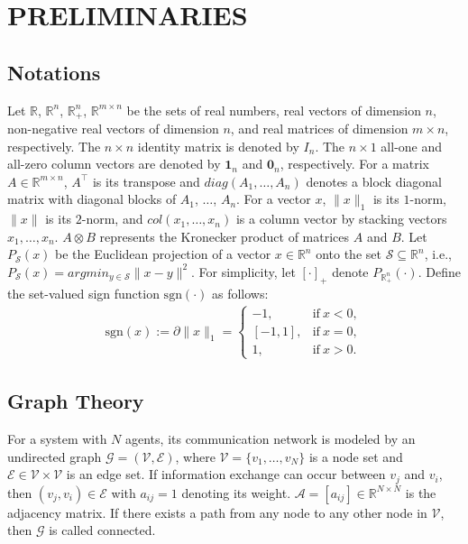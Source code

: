 \documentclass[letterpaper, 10 pt, conference]{ieeeconf}  %
\newcommand{\sign}[1]{\mathrm{sgn}(#1)}
\begin{document}
\section{PRELIMINARIES}\label{pre}

\subsection{Notations}
Let $\mathbb{R}$, $\mathbb{R}^n$, $\mathbb{R}_+^n$, $\mathbb{R}^{m\times n}$ be the sets of  real numbers, real vectors of dimension $n$, non-negative real vectors of dimension $n$, and real matrices of dimension $m\times n$, respectively.
The $n\times n$ identity matrix is denoted by $I_n$. The $n\times 1$ all-one and all-zero column vectors are denoted by $\boldsymbol1_n$ and $\boldsymbol0_n$, respectively.
For a matrix $A\in\mathbb{R}^{m \times n}$, $A^\top $ is its transpose and  $diag(A_1,\dots,A_n)$ denotes a block diagonal matrix with diagonal blocks of $A_1$, $\dots$, $A_n$.
For a vector $x$, $\|x\|_1$ is its $1$-norm, $\|x\|$ is its $2$-norm, and $col(x_1,\dots,x_n)$ is a column vector by stacking vectors $x_1,\dots,x_n$. $A\otimes B$ represents the Kronecker product of matrices $A$ and $B$. 
Let $P_\mathcal{S}(x)$ be the Euclidean projection of a vector $x\in \mathbb{R}^n$ onto the set $\mathcal{S} \subseteq \mathbb{R}^n$, i.e., 
$P_\mathcal{S}(x)=argmin_{y\in\mathcal{S}}\|x-y\|^2$. For simplicity, let $[\cdot]_+$ denote $P_{\mathbb{R}_+^n}(\cdot)$. Define the set-valued sign function $\mathrm{sgn}(\cdot)$ as follows:
\begin{align*}
	\sign{x}:=\partial\|x\|_1=
	\begin{cases}
		-1,&\mathrm{if}\  x<0,\\
		[-1,1],&\mathrm{if}\  x=0,\\
		1,&\mathrm{if}\  x>0.
	\end{cases}
\end{align*}


\subsection{Graph Theory}
For a system with $N$ agents, its communication network is modeled by an undirected graph $\mathcal{G} = (\mathcal{V}, \mathcal{E})$, where $\mathcal{V} = \{v_1, \dots, v_N\}$ is a node set and $\mathcal{E} \in \mathcal{V} \times \mathcal{V}$ is an edge set. If information exchange can occur between $v_j$ and $v_i$, then $(v_j,v_i) \in \mathcal{E}$ with $a_{ij}=1$ denoting its weight.  $\mathcal{A}= [a_{ij}]\in \mathbb{R}^{N \times N}$ is the adjacency matrix. If there exists a path from any node to any other node in $\mathcal{V}$, then $\mathcal{G}$ is called connected.%
\end{document}
